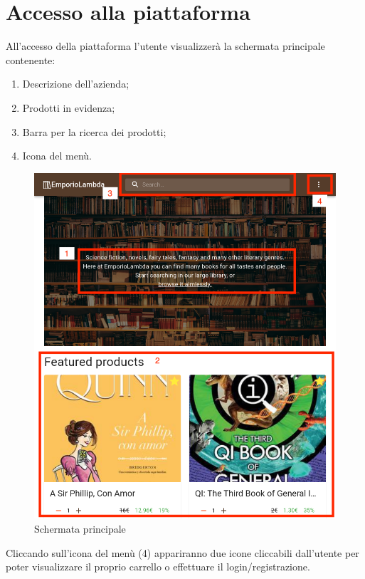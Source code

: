 \section{Accesso alla piattaforma}\label{Accesso}
All'accesso della piattaforma l'utente visualizzerà la schermata principale contenente:
\begin{enumerate}
	\item Descrizione dell'azienda;
	\item Prodotti in evidenza;
	\item Barra per la ricerca dei prodotti;
	\item Icona del menù. 
\end{enumerate} 
\begin{figure}[H]
	\centering
	\includegraphics[scale=0.4]{Immagini/Acquirente/home_primo_accesso.png}
	\caption{Schermata principale}
	\label{fig:Home}
\end{figure}
Cliccando sull'icona del menù (4) appariranno due icone cliccabili dall'utente per poter visualizzare il proprio carrello o effettuare il login/registrazione.
